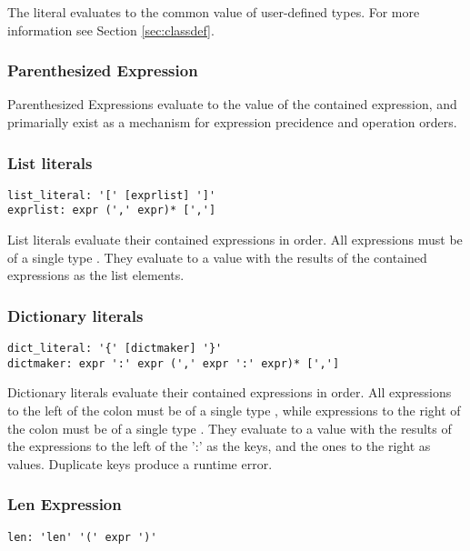 The  literal evaluates to the common  value of
user-defined types. For more information see Section \ref{sec:classdef}.

\subsubsection{Parenthesized Expression}
Parenthesized Expressions evaluate to the value of the contained expression, and
primarially exist as a mechanism for expression precidence and operation orders.

\subsubsection{List literals}

\begin{lstlisting}
list_literal: '[' [exprlist] ']'
exprlist: expr (',' expr)* [',']
\end{lstlisting}

List literals evaluate their contained expressions in order. All expressions
must be of a single type . They evaluate to a \code{[T]} value with the
results of the contained expressions as the list elements.

\subsubsection{Dictionary literals}

\begin{lstlisting}
dict_literal: '{' [dictmaker] '}'
dictmaker: expr ':' expr (',' expr ':' expr)* [',']
\end{lstlisting}

Dictionary literals evaluate their contained expressions in order. All
expressions to the left of the colon must be of a single type , while
expressions to the right of the colon must be of a single type . They
evaluate to a  value with the results of the expressions to the
left of the ':' as the keys, and the ones to the right as values. Duplicate keys
produce a runtime error.

\subsubsection{Len Expression}

\begin{lstlisting}
len: 'len' '(' expr ')'
\end{lstlisting}

